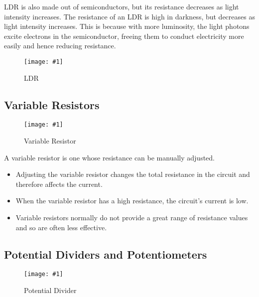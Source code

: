\documentclass[a4paper,12pt]{article}
\newcommand{\img}[4]{\begin{center}
  \begin{figure}[H]
    \centering
    \texttt{[image: \#1]}
    \caption{#3}
    \label{fig:#4}
  \end{figure}
\end{center}}
\begin{document}
LDR is also made out of semiconductors, but its resistance decreases as light intensity increases. The resistance of an LDR is high in darkness, but decreases as light intensity increases. This is because with more luminosity, the light photons excite electrons in the semiconductor, freeing them to conduct electricity more easily and hence reducing resistance.

\img{ldr.png}{0.7}{LDR}{ldr}

\pagebreak

\subsection{Variable Resistors}

\img{varresistor.png}{0.4}{Variable Resistor}{varresistor}

A variable resistor is one whose resistance can be manually adjusted.
\begin{itemize}
  \item Adjusting the variable resistor changes the total resistance in the circuit and therefore affects the current.
  \item When the variable resistor has a high resistance, the circuit's current is low.
  \item Variable resistors normally do not provide a great range of resistance values and so are often less effective.
\end{itemize}

\pagebreak


\subsection{Potential Dividers and Potentiometers}

\img{potential_divider.png}{0.5}{Potential Divider}{potentialdivider}
\end{document}
